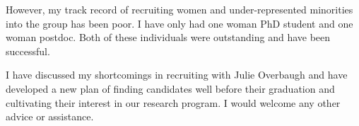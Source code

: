 \documentclass[nobib]{tufte-handout}
\begin{document}
However, my track record of recruiting women and under-represented minorities into the group has been poor.
I have only had one woman PhD student and one woman postdoc.
Both of these individuals were outstanding and have been successful.

I have discussed my shortcomings in recruiting with Julie Overbaugh and have developed a new plan of finding candidates well before their graduation and cultivating their interest in our research program.
I would welcome any other advice or assistance.


\newpage


\end{document}
